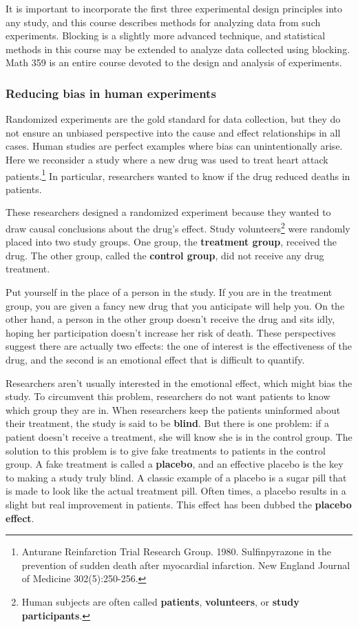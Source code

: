 \documentclass[
]{book}
\begin{document}
It is important to incorporate the first three experimental design principles into any study, and this course describes methods for analyzing data from such experiments. Blocking is a slightly more advanced technique, and statistical methods in this course may be extended to analyze data collected using blocking. Math 359 is an entire course devoted to the design and analysis of experiments.

\hypertarget{reducing-bias-in-human-experiments}{%
\subsubsection{Reducing bias in human experiments}\label{reducing-bias-in-human-experiments}}

Randomized experiments are the gold standard for data collection, but they do not ensure an unbiased perspective into the cause and effect relationships in all cases. Human studies are perfect examples where bias can unintentionally arise. Here we reconsider a study where a new drug was used to treat heart attack patients.\footnote{Anturane Reinfarction Trial Research Group. 1980. Sulfinpyrazone in the prevention of sudden death after myocardial infarction. New England Journal of Medicine 302(5):250-256.} In particular, researchers wanted to know if the drug reduced deaths in patients.

These researchers designed a randomized experiment because they wanted to draw causal conclusions about the drug's effect. Study volunteers\footnote{Human subjects are often called \textbf{patients}, \textbf{volunteers}, or \textbf{study participants}.} were randomly placed into two study groups. One group, the \textbf{treatment group}, received the drug. The other group, called the \textbf{control group}, did not receive any drug treatment.

Put yourself in the place of a person in the study. If you are in the treatment group, you are given a fancy new drug that you anticipate will help you. On the other hand, a person in the other group doesn't receive the drug and sits idly, hoping her participation doesn't increase her risk of death. These perspectives suggest there are actually two effects: the one of interest is the effectiveness of the drug, and the second is an emotional effect that is difficult to quantify.

Researchers aren't usually interested in the emotional effect, which might bias the study. To circumvent this problem, researchers do not want patients to know which group they are in. When researchers keep the patients uninformed about their treatment, the study is said to be \textbf{blind}. But there is one problem: if a patient doesn't receive a treatment, she will know she is in the control group. The solution to this problem is to give fake treatments to patients in the control group. A fake treatment is called a \textbf{placebo}, and an effective placebo is the key to making a study truly blind. A classic example of a placebo is a sugar pill that is made to look like the actual treatment pill. Often times, a placebo results in a slight but real improvement in patients. This effect has been dubbed the \textbf{placebo effect}.
\end{document}
